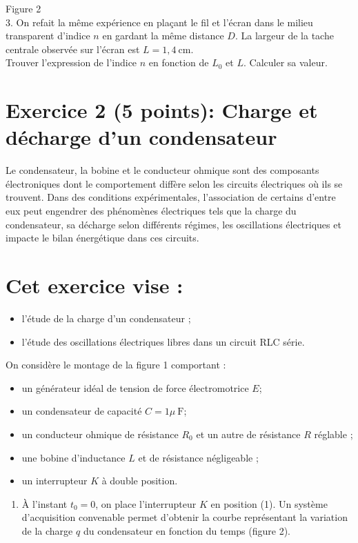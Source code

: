 Figure 2\\
3. On refait la même expérience en plaçant le fil et l'écran dans le milieu transparent d'indice $n$ en gardant la même distance $D$. La largeur de la tache centrale observée sur l'écran est $L=1,4 \mathrm{~cm}$.\\
Trouver l'expression de l'indice $n$ en fonction de $L_{0}$ et $L$. Calculer sa valeur.

\section*{Exercice 2 (5 points): Charge et décharge d'un condensateur}
Le condensateur, la bobine et le conducteur ohmique sont des composants électroniques dont le comportement diffère selon les circuits électriques où ils se trouvent. Dans des conditions expérimentales, l'association de certains d'entre eux peut engendrer des phénomènes électriques tels que la charge du condensateur, sa décharge selon différents régimes, les oscillations électriques et impacte le bilan énergétique dans ces circuits.

\section*{Cet exercice vise :}
\begin{itemize}
  \item l'étude de la charge d'un condensateur ;
  \item l'étude des oscillations électriques libres dans un circuit RLC série.
\end{itemize}

On considère le montage de la figure 1 comportant :

\begin{itemize}
  \item un générateur idéal de tension de force électromotrice $E$;
  \item un condensateur de capacité $C=1 \mu \mathrm{~F}$;
  \item un conducteur ohmique de résistance $R_{0}$ et un autre de résistance $R$ réglable ;
  \item une bobine d'inductance $L$ et de résistance négligeable ;
  \item un interrupteur $K$ à double position.
\end{itemize}

\begin{enumerate}
  \item À l'instant $t_{0}=0$, on place l'interrupteur $K$ en position (1). Un système d'acquisition convenable permet d'obtenir la courbe représentant la variation de la charge $q$ du condensateur en fonction du temps (figure 2).
\end{enumerate}

